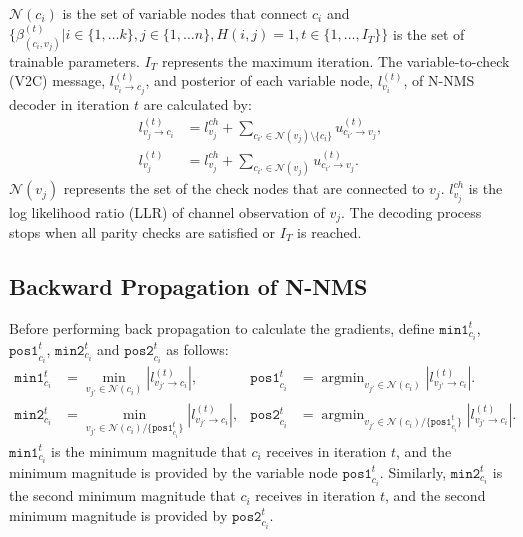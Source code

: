 \documentclass [PhD] {uclathes}
\DeclareMathOperator*{\argminB}{argmin}   %
\begin{document}
$\mathcal{N}(c_i)$ is the set of variable nodes that connect $c_i$ and 
$\bigl\{\beta^{(t)}_{(c_i,v_j)}|i\in\{1,\ldots k\},j\in\{1,\ldots n\}, \allowbreak H(i,j)=1, t\in\{1,\ldots, I_T\} \bigr\}$ is the set of  trainable parameters. $I_T$ represents the maximum iteration. The variable-to-check (V2C) message, $l^{(t)}_{v_i\rightarrow c_j}$, and posterior of each variable node, $l_{v_i}^{(t)}$, of N-NMS decoder in iteration $t$
 are calculated by:
\begin{align}
l^{(t)}_{v_j\rightarrow c_i} &=  l^{ch}_{v_j} + \sum_{c_{i'}\in \mathcal{N}(v_j)\setminus\{c_i\}} u^{(t)}_{c_{i'}\rightarrow v_j}, \label{equ: v2c_update}\\
l^{(t)}_{v_j} &= l^{ch}_{v_j} + \sum_{c_{i'}\in \mathcal{N}(v_j)} u^{(t)}_{c_{i'}\rightarrow v_j}.\label{equ: pos_update}
\end{align}
$\mathcal{N}(v_j)$ represents the set of the check nodes that are connected to $v_j$. $l^{ch}_{v_j}$ is the log likelihood ratio (LLR) of channel observation of $v_j$. The decoding process stops when all parity checks are satisfied or $I_T$ is reached. 

\subsection{Backward Propagation of N-NMS}
Before performing back propagation to calculate the gradients, define $\texttt{min1}^{t}_{c_i}$, $\texttt{pos1}^{t}_{c_i}$, $\texttt{min2}^{t}_{c_i}$ and $\texttt{pos2}^{t}_{c_i}$ as follows:
\begin{align}
    \texttt{min1}^{t}_{c_i} &= \min_{v_{j'}\in \mathcal{N}(c_i)} |l^{(t)}_{v_{j'}\rightarrow c_{i}}|, &
    \texttt{pos1}^{t}_{c_i} &= \argminB_{v_{j'}\in \mathcal{N}(c_i)} |l^{(t)}_{v_{j'}\rightarrow c_{i}}|.\label{equ: min1}\\
    \texttt{min2}^{t}_{c_i} &= \min_{v_{j'}\in \mathcal{N}(c_i)/\{\texttt{pos1}^{t}_{c_i}\}}|l^{(t)}_{v_{j'}\rightarrow c_{i}}|,&
    \texttt{pos2}^{t}_{c_i} &= \argminB_ {v_{j'}\in \mathcal{N}(c_i)/\{\texttt{pos1}^{t}_{c_i}\}}|l^{(t)}_{v_{j'}\rightarrow c_{i}}|\label{equ: pos}.
\end{align}
$\texttt{min1}^{t}_{c_i}$ is the minimum magnitude that $c_i$ receives in iteration $t$, and the minimum magnitude is provided by the variable node $\texttt{pos1}^{t}_{c_i}$. Similarly,  $\texttt{min2}^{t}_{c_i}$ is the second minimum magnitude that $c_i$ receives in iteration $t$, and the second minimum magnitude is provided by  $\texttt{pos2}^{t}_{c_i}$.
\end{document}
